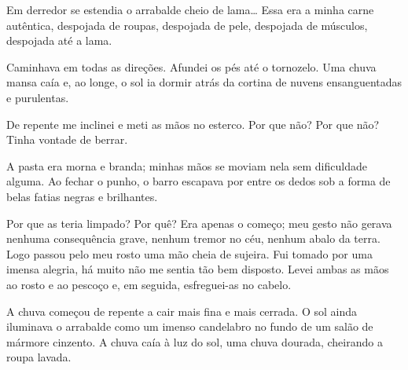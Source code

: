 Em derredor se estendia o arrabalde cheio de lama\ldots{} Essa era a minha
carne autêntica, despojada de roupas, despojada de pele, despojada de
músculos, despojada até a lama.


Caminhava em todas as direções. Afundei os pés até o tornozelo. Uma chuva
mansa caía e, ao longe, o sol ia dormir atrás da cortina de nuvens
ensanguentadas e purulentas.

De repente me inclinei e meti as mãos no esterco. Por que não? Por que não?
Tinha vontade de berrar.

A pasta era morna e branda; minhas mãos se moviam nela sem dificuldade alguma.
Ao fechar o punho, o barro escapava por entre os dedos sob a forma de belas
fatias negras e brilhantes.




Por que as teria limpado? Por quê? Era apenas o começo; meu gesto não gerava
nenhuma consequência grave, nenhum tremor no céu, nenhum abalo da terra. Logo
passou pelo meu rosto uma mão cheia de sujeira. Fui tomado por uma imensa
alegria, há muito não me sentia tão bem disposto. Levei ambas as mãos ao
rosto e ao pescoço e, em seguida, esfreguei-as no cabelo. 

A chuva começou de repente a cair mais fina e mais cerrada. O sol ainda
iluminava o arrabalde como um imenso candelabro no fundo de um salão de
mármore cinzento. A chuva caía à luz do sol, uma chuva dourada, cheirando a
roupa lavada.

